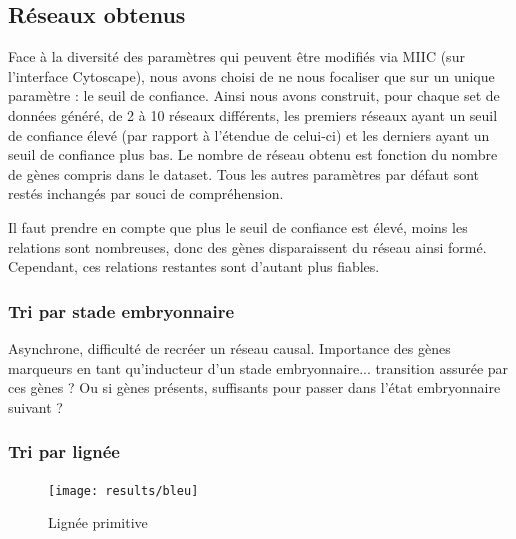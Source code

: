 \documentclass[fleqn,11pt]{SelfArx} %
\begin{document}
\subsection{Réseaux obtenus}
Face à la diversité des paramètres qui peuvent être modifiés via MIIC (sur l'interface Cytoscape), nous avons choisi de ne nous focaliser que sur un unique paramètre : le seuil de confiance. Ainsi nous avons construit, pour chaque set de données généré, de 2 à 10 réseaux différents, les premiers réseaux ayant un seuil de confiance élevé (par rapport à l'étendue de celui-ci) et les derniers ayant un seuil de confiance plus bas. Le nombre de réseau obtenu est fonction du nombre de gènes compris dans le dataset. Tous les autres paramètres par défaut sont restés inchangés par souci de compréhension. 



Il faut prendre en compte que plus le seuil de confiance est élevé, moins les relations sont nombreuses, donc des gènes disparaissent du réseau ainsi formé. Cependant, ces relations restantes sont d'autant plus fiables. 

\subsubsection{Tri par stade embryonnaire}
Asynchrone, difficulté de recréer un réseau causal. 
Importance des gènes marqueurs en tant qu'inducteur d'un stade embryonnaire... transition assurée par ces gènes ? Ou si gènes présents, suffisants pour passer dans l'état embryonnaire suivant ?


\subsubsection{Tri par lignée}
\begin{figure}[ht]
\centering
\texttt{[image: results/bleu]}
\caption{Lignée primitive}
\label{fig:PS}
\end{figure}
\end{document}
